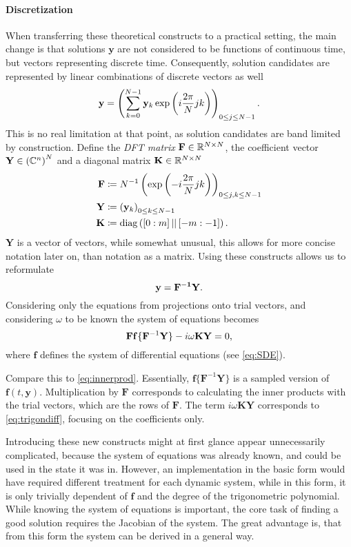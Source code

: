 \paragraph{Discretization} When transferring these theoretical constructs to a practical setting, the main change is that solutions $\mathbf{y}$ are not considered to be functions of continuous time, but vectors representing discrete time.
Consequently, solution candidates are represented by linear combinations of discrete vectors as well
	\[
		\mathbf{\mathbf{y}} = \left( \sum_{k=0}^{N-1} \mathbf{y}_k \exp\left(i \frac{2\pi}{N} j k\right) \right)_{0 \le j \le N-1} \text.
	\]
This is no real limitation at that point, as solution candidates are band limited by construction.
Define the \emph{DFT matrix} $\mathbf F \in \mathbb{R}^{N \times N}$, the coefficient vector $\mathbf Y \in \left(\mathbb{C}^n\right)^N$ and a diagonal matrix $\mathbf K \in \mathbb{R}^{N\times N}$
	\begin{align*}
		\mathbf{F} &\coloneqq N^{-1} \left( \exp\left(-i \frac{2\pi}{N} j k \right) \right)_{0 \le j,k \le N-1} \\
		\mathbf{Y} &\coloneqq \left(\mathbf{y}_k\right)_{0 \le k \le N-1} \\
		\mathbf K &\coloneqq \operatorname{diag}\left( [0:m]\, ||\, [-m:-1] \right) \text.
	\end{align*}
$\mathbf Y$ is a vector of vectors, while somewhat unusual, this allows for more concise notation later on, than notation as a matrix.
Using these constructs allows us to reformulate
	\[
			\mathbf{y} = \mathbf{F^{-1}} \mathbf{Y} \text.
	\]
Considering only the equations from projections onto trial vectors, and considering $\omega$ to be known the system of equations becomes %
	\[
		\mathbf{F} \mathbf{f}\{\mathbf F^{-1} \mathbf{Y}\} - i \omega \mathbf K \mathbf Y = 0\text,
	\]
where $\mathbf{f}$ defines the system of differential equations (see \autoref{eq:SDE}).

Compare this to \autoref{eq:innerprod}.
Essentially, $\mathbf{f}\{\mathbf F^{-1} \mathbf{Y}\}$ is a sampled version of $\mathbf f(t,\mathbf y)$.
Multiplication by $\mathbf F$ corresponds to calculating the inner products with the trial vectors, which are the rows of $\mathbf F$.
The term $i \omega \mathbf K \mathbf Y$ corresponds to \autoref{eq:trigondiff}, focusing on the coefficients only.

Introducing these new constructs might at first glance appear unnecessarily complicated, because the system of equations was already known, and could be used in the state it was in.
However, an implementation in the basic form would have required different treatment for each dynamic system, while in this form, it is only trivially dependent of $\mathbf f$ and the degree of the trigonometric polynomial.
While knowing the system of equations is important, the core task of finding a good solution requires the Jacobian of the system.
The great advantage is, that from this form the system can be derived in a general way.


